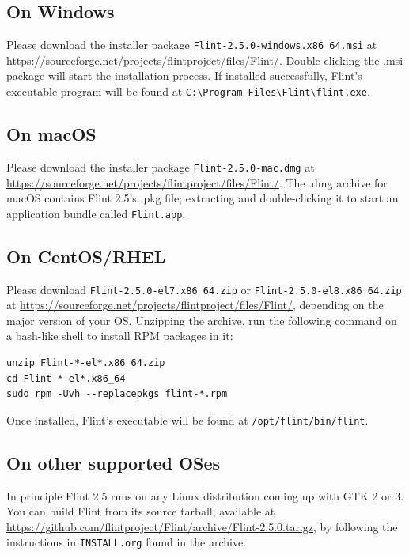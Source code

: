 \documentclass[a4paper,10pt]{report}
\begin{document}
\subsection{On Windows}
\label{sec:orgc216b76}
Please download the installer package \texttt{Flint-2.5.0-windows.x86\_64.msi} at
\url{https://sourceforge.net/projects/flintproject/files/Flint/}.
Double-clicking the .msi package will start the installation process.
If installed successfully, Flint's executable program will be found at
\texttt{C:\textbackslash{}Program Files\textbackslash{}Flint\textbackslash{}flint.exe}.

\subsection{On macOS}
\label{sec:orgd132e3d}
Please download the installer package \texttt{Flint-2.5.0-mac.dmg} at
\url{https://sourceforge.net/projects/flintproject/files/Flint/}.
The .dmg archive for macOS contains Flint 2.5's .pkg file; extracting and
double-clicking it to start an application bundle called
\texttt{Flint.app}.

\subsection{On CentOS/RHEL}
\label{sec:org4b91a60}
Please download \texttt{Flint-2.5.0-el7.x86\_64.zip} or \texttt{Flint-2.5.0-el8.x86\_64.zip}
at \url{https://sourceforge.net/projects/flintproject/files/Flint/}, depending
on the major version of your OS.
Unzipping the archive, run the following command on a bash-like shell to install
RPM packages in it:
\begin{verbatim}
unzip Flint-*-el*.x86_64.zip
cd Flint-*-el*.x86_64
sudo rpm -Uvh --replacepkgs flint-*.rpm
\end{verbatim}
Once installed, Flint's executable will be found at
\texttt{/opt/flint/bin/flint}.

\subsection{On other supported OSes}
\label{sec:org9f4e458}
In principle Flint 2.5 runs on any Linux distribution coming up with GTK 2 or 3.
You can build Flint from its source tarball, available at
\url{https://github.com/flintproject/Flint/archive/Flint-2.5.0.tar.gz},
by following the instructions in \texttt{INSTALL.org} found in the archive.
\end{document}
